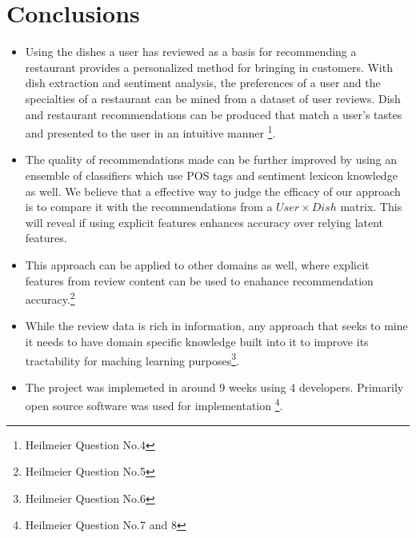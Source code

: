 \documentclass[twoside,12pt]{article}
\begin{document}
\section{Conclusions}
\label{Conclusions}
\begin{itemize}
\item
Using the dishes a user has reviewed as a basis for recommending a restaurant provides a personalized method for bringing in customers. With dish extraction and sentiment analysis, the preferences of a user and the specialties of a restaurant can be mined from a dataset of user reviews. Dish and restaurant recommendations can be produced that match a user's tastes and presented to the user in an intuitive manner \footnote{Heilmeier Question No.4}.
\item
The quality of recommendations made can be further improved by using an ensemble of classifiers which use POS tags and sentiment lexicon knowledge as well. We believe that a effective way to judge the efficacy of our approach is to compare it with the recommendations from a $User \times Dish$ matrix. This will reveal if using explicit features enhances accuracy over relying latent features.
\item
This approach can be applied to other domains as well, where explicit features from review content can be used to enahance recommendation accuracy.\footnote{Heilmeier Question No.5}
\item
While the review data is rich in information, any approach that seeks to mine it needs to have domain specific knowledge built into it to improve its tractability for maching learning purposes\footnote{Heilmeier Question No.6}.
\item
The project was implemeted in around 9 weeks using 4 developers. Primarily open source software was used for implementation \footnote{Heilmeier Question No.7 and 8}.
\end{itemize}
\end{document}
